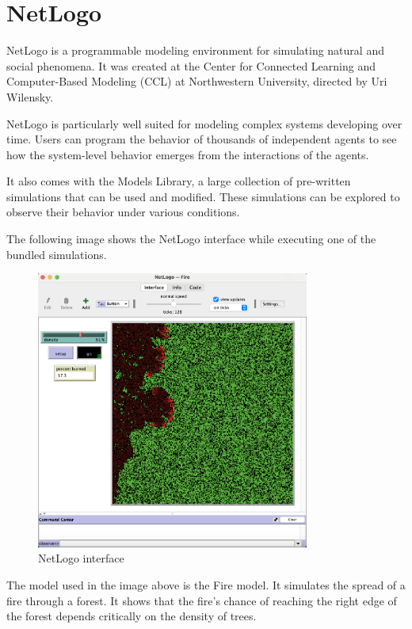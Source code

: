 \documentclass[12pt,a4paper,openright,twoside]{book}
\begin{document}
\section{NetLogo}

NetLogo is a programmable modeling environment for simulating natural and social phenomena. It was created at the Center
for Connected Learning and Computer-Based Modeling (CCL) at Northwestern University, directed by Uri Wilensky.

NetLogo is particularly well suited for modeling complex systems developing over time.
Users can program the behavior of thousands of independent agents to see how the system-level behavior emerges from the interactions of the agents.

It also comes with the Models Library, a large collection of pre-written simulations that can be used and modified.
These simulations can be explored to observe their behavior under various conditions.

The following image shows the NetLogo interface while executing one of the bundled simulations.

\begin{figure}[h]
  \centering
  \includegraphics[width=0.8\textwidth]{figures/NetLogo-interface.png}
  \caption{NetLogo interface}
\end{figure}

The model used in the image above is the Fire model.
It simulates the spread of a fire through a forest. It shows that the fire's chance of reaching the right edge
of the forest depends critically on the density of trees.
\end{document}
